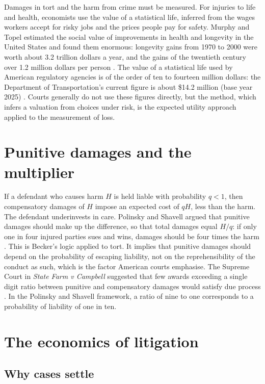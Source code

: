 Damages in tort and the harm from crime must be measured. For injuries to life and health, economists use the value of a statistical life, inferred from the wages workers accept for risky jobs and the prices people pay for safety. Murphy and Topel estimated the social value of improvements in health and longevity in the United States and found them enormous: longevity gains from 1970 to 2000 were worth about 3.2 trillion dollars a year, and the gains of the twentieth century over 1.2 million dollars per person \citep{murphy2006}. The value of a statistical life used by American regulatory agencies is of the order of ten to fourteen million dollars: the Department of Transportation's current figure is about \$14.2 million (base year 2025) \citep{dot2025}. Courts generally do not use these figures directly, but the method, which infers a valuation from choices under risk, is the expected utility approach applied to the measurement of loss.

\section{Punitive damages and the multiplier}

If a defendant who causes harm $H$ is held liable with probability $q < 1$, then compensatory damages of $H$ impose an expected cost of $qH$, less than the harm. The defendant underinvests in care. Polinsky and Shavell argued that punitive damages should make up the difference, so that total damages equal $H/q$: if only one in four injured parties sues and wins, damages should be four times the harm \citep{polinsky1998}. This is Becker's logic applied to tort. It implies that punitive damages should depend on the probability of escaping liability, not on the reprehensibility of the conduct as such, which is the factor American courts emphasise. The Supreme Court in \emph{State Farm v Campbell} suggested that few awards exceeding a single digit ratio between punitive and compensatory damages would satisfy due process \citep{statefarm2003}. In the Polinsky and Shavell framework, a ratio of nine to one corresponds to a probability of liability of one in ten.

\section{The economics of litigation}

\subsection{Why cases settle}

